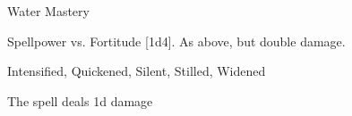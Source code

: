 \begin{spellsection}{Water Mastery}
\begin{spellheader}
\end{spellheader}
\begin{spellcontent}
\begin{spelltargetinginfo}
\end{spelltargetinginfo}
\begin{spelleffects}
\begin{spellattack}{Spellpower vs. Fortitude}
\spellsuccess {}[1d4].
\spellcritical As above, but double damage.
\end{spellattack}
\end{spelleffects}
\end{spellcontent}
\begin{spellfooter}
 Intensified, Quickened, Silent, Stilled, Widened
\end{spellfooter}
\begin{spellsubcontent}
\begin{spellcantrip}
The spell deals \minus1d damage
\end{spellcantrip}
\end{spellsubcontent}
\end{spellsection}
